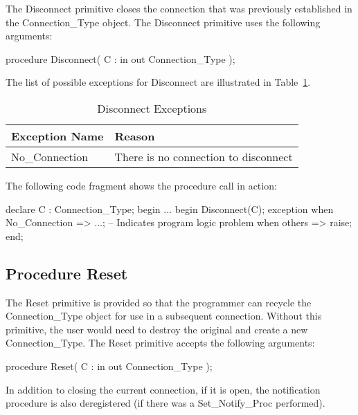 \documentclass[english,letterpaper]{book}
\begin{document}
The Disconnect primitive closes the connection that was previously
established in the Connection\_Type object. The Disconnect primitive
uses the following arguments:

\begin{Code}
procedure Disconnect(
   C : in out Connection_Type
);
\end{Code}

The list of possible exceptions for Disconnect are illustrated in Table~\ref{t:dconx}.

\begin{table}
   \begin{center}
      \begin{tabular}{ll}
         Exception Name       &  Reason\\
         \hline 
         No\_Connection       &  There is no connection to disconnect\index{No\_Connection}\\
      \end{tabular}
   \end{center}
   \caption{Disconnect Exceptions}\label{t:dconx}
\end{table}

The following code fragment shows the procedure call in action:

\begin{Example}
declare
   C : Connection_Type;
begin
   ...
   begin
      Disconnect(C);
   exception
      when No_Connection =>
         ...; -- Indicates program logic problem
      when others =>
         raise;
   end;
\end{Example}

\subsection{Procedure Reset}

The Reset primitive is provided so that the programmer can recycle
the Connection\_Type object for use in a subsequent connection. Without
this primitive, the user would need to destroy the original and create
a new Connection\_Type. The Reset primitive accepts the following
arguments:

\begin{Code}
procedure Reset(
   C : in out Connection_Type
);
\end{Code}

In addition to closing the current connection, if it is open, the
notification procedure is also deregistered (if there was a Set\_Notify\_Proc
performed).
\end{document}
